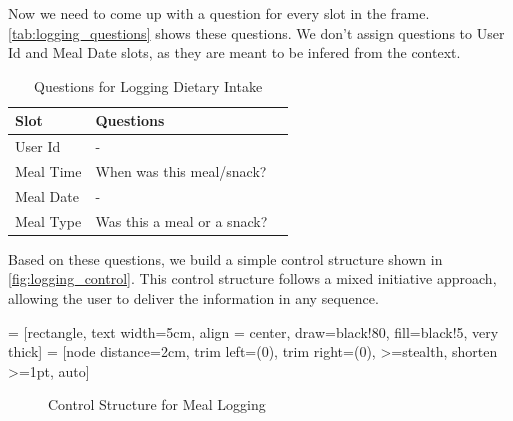 Now we need to come up with a question for every slot in the frame.
\autoref{tab:logging_questions} shows these questions.
We don't assign questions to User Id and Meal Date slots, as they are meant to be infered from the context.

\begin{table}[htbp]
  \caption[Question for Logging Dietary Intake]{Questions for Logging Dietary Intake}\label{tab:logging_questions}
  \centering
  \begin{tabular}{l|l|l}
    Slot&Questions\\ \toprule
    User Id&-\\ \hline
    Meal Time&When was this meal/snack?\\ \hline
    Meal Date&-\\ \hline
    Meal Type&Was this a meal or a snack?\\ \hline
  \end{tabular}
\end{table}

Based on these questions, we build a simple control structure shown in \autoref{fig:logging_control}.
This control structure follows a mixed initiative approach, 
allowing the user to deliver the information in any sequence.

\usetikzlibrary{automata,positioning}
 = [rectangle,
                    text width=5cm,
                    align = center,
                    draw=black!80,
                    fill=black!5,
                    very thick]
 = [node distance=2cm,
                      trim left=(0),
                      trim right=(0),
                      >=stealth,
                      shorten >=1pt,
                      auto]
\begin{figure}[htbp]
  \centering
  \caption[Control Structure for Meal Logging]{Control Structure for Meal Logging}\label{fig:logging_control}
\end{figure}


